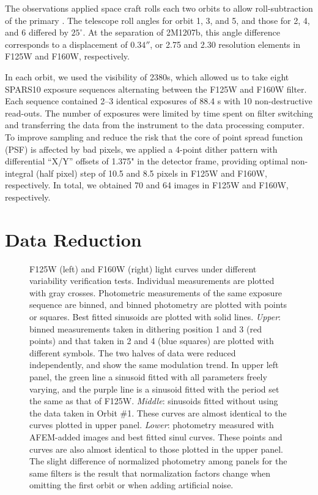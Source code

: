\documentclass[apj]{emulateapj}
\newcommand{\reviseTwo}[1]{\textbf{{\color{cyan}{#1}}}}
\renewcommand{\reviseTwo}{}
\begin{document}
The observations applied space craft rolls each two orbits to allow
roll-subtraction of the primary \citep[e.g.][]{Song2006}. The
telescope roll angles for orbit 1, 3, and 5, and those for 2, 4, and 6
differed by $25^{\circ}$. At the separation of 2M1207b, this angle
difference corresponds to a displacement of $0.34''$, or 2.75 and 2.30
resolution elements in F125W and F160W, respectively.

\reviseTwo{In each orbit, we used the visibility of 2380s, which allowed us
  to take eight SPARS10 exposure sequences
  alternating between the F125W and F160W filter. Each sequence contained
  2--3 identical exposures of 88.4 s with 10 non-destructive read-outs. The number of exposures were limited by
  time spent on filter switching and transferring the data from the
  instrument to the data processing computer.} To improve sampling and reduce the risk
that the core of point spread function (PSF) is affected by bad
pixels, we applied a 4-point dither pattern with differential ``X/Y''
offsets of 1.375" in the detector frame, providing optimal
non-integral (half pixel) step of 10.5 and 8.5 pixels in F125W and
F160W, respectively. In total, we obtained 70 and 64 images  in
F125W and F160W, respectively.

\section{Data Reduction}

 \begin{figure}
  \centering
  \caption{F125W (left) and F160W (right) light curves under different
    variability verification tests. Individual measurements are
    plotted with gray crosses. Photometric measurements of the same
    exposure sequence are binned, and binned photometry are plotted
    with points or squares. Best fitted sinusoids are plotted with
    solid lines. {\em Upper}: binned measurements taken in dithering
    position 1 and 3 (red points) and that taken in 2 and 4 (blue
    squares) are plotted with different symbols. \reviseTwo{The two halves
      of data were reduced independently, and show the same modulation
      trend.} In upper left panel, the green line a sinusoid fitted
    with all parameters freely varying, and the purple line is a
    sinusoid fitted with the period set the same as that of
    F125W. {\em Middle}: sinusoids fitted without using the data taken
    in Orbit \#1. These curves are almost identical to the curves
    plotted in upper panel. {\em Lower}: photometry measured with
    AFEM-added images and best fitted sinul curves. These points and
    curves are also almost identical to those plotted in the upper
    panel. \reviseTwo{The slight difference of normalized photometry
      among panels for the same filters is the result that
      normalization factors change when omitting the first orbit or when
      adding artificial noise.}}
  \label{fig:2}
  
\end{figure}
\end{document}
